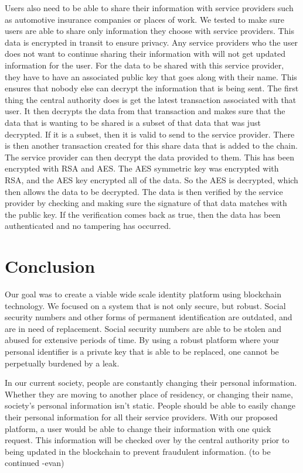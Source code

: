 \documentclass[letterpaper, 10 pt, conference]{ieeeconf}  %
\begin{document}
Users also need to be able to share their information with service providers such as automotive insurance companies or places of work.  We tested to make sure users are able to share only information they choose with service providers.  This data is encrypted in transit to ensure privacy.  Any service providers who the user does not want to continue sharing their information with will not get updated information for the user. For the data to be shared with this service provider, they have to have an associated public key that goes along with their name. This ensures that nobody else can decrypt the information that is being sent. The first thing the central authority does is get the latest transaction associated with that user. It then decrypts the data from that transaction and makes sure that the data that is wanting to be shared is a subset of that data that was just decrypted. If it is a subset, then it is valid to send to the service provider. There is then another transaction created for this share data that is added to the chain. The service provider can then decrypt the data provided to them. This has been encrypted with RSA and AES. The AES symmetric key was encrypted with RSA, and the AES key encrypted all of the data. So the AES is decrypted, which then allows the data to be decrypted. The data is then verified by the service provider by checking and making sure the signature of that data matches with the public key. If the verification comes back as true, then the data has been authenticated and no tampering has occurred. 

\section{Conclusion}

Our goal was to create a viable wide scale identity platform using blockchain technology.  We focused on a system that is not only secure, but robust.  Social security numbers and other forms of permanent identification are outdated, and are in need of replacement.  Social security numbers are able to be stolen and abused for extensive periods of time.  By using a robust platform where your personal identifier is a private key that is able to be replaced, one cannot be perpetually burdened by a leak.  

In our current society, people are constantly changing their personal information.  Whether they are moving to another place of residency, or changing their name, society's personal information isn't static.  People should be able to easily change their personal information for all their service providers.  With our proposed platform, a user would be able to change their information with one quick request.  This information will be checked over by the central authority prior to being updated in the blockchain to prevent fraudulent information. (to be continued -evan)  



\end{document}
